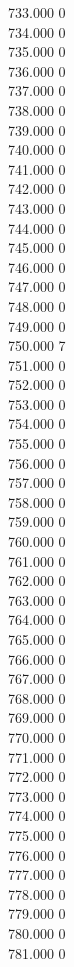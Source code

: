 { 733.000	0 \\
 734.000	0 \\
 735.000	0 \\
 736.000	0 \\
 737.000	0 \\
 738.000	0 \\
 739.000	0 \\
 740.000	0 \\
 741.000	0 \\
 742.000	0 \\
 743.000	0 \\
 744.000	0 \\
 745.000	0 \\
 746.000	0 \\
 747.000	0 \\
 748.000	0 \\
 749.000	0 \\
 750.000	7 \\
 751.000	0 \\
 752.000	0 \\
 753.000	0 \\
 754.000	0 \\
 755.000	0 \\
 756.000	0 \\
 757.000	0 \\
 758.000	0 \\
 759.000	0 \\
 760.000	0 \\
 761.000	0 \\
 762.000	0 \\
 763.000	0 \\
 764.000	0 \\
 765.000	0 \\
 766.000	0 \\
 767.000	0 \\
 768.000	0 \\
 769.000	0 \\
 770.000	0 \\
 771.000	0 \\
 772.000	0 \\
 773.000	0 \\
 774.000	0 \\
 775.000	0 \\
 776.000	0 \\
 777.000	0 \\
 778.000	0 \\
 779.000	0 \\
 780.000	0 \\
 781.000	0 \\
}
